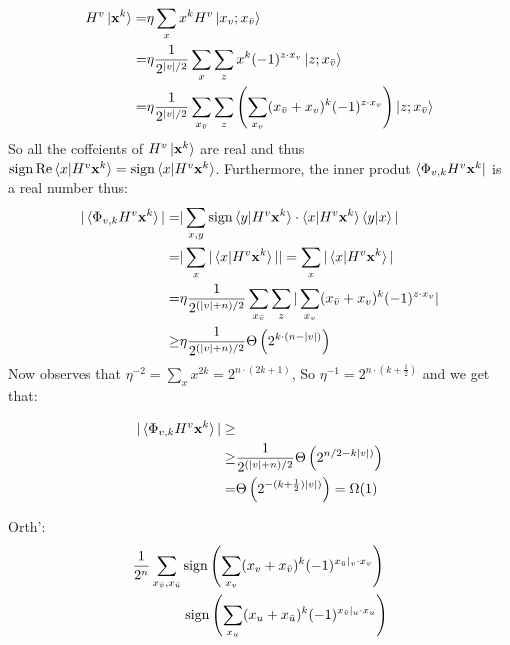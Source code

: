 \documentclass[manuscript,screen,review]{acmart}
\begin{document}
\begin{equation*}
  \begin{split}
    H^{v}\ket{\mathbf{x}^{k}} = &  \eta \sum_{x}x^{k}H^{v}\ket{x_{v};
    x_{\bar{v}}} \\
    = &  \eta \frac{1}{2^{|v|/2}}\sum_{x}\sum_{z}x^{k}(-1)^{z \cdot
    x_{v}}\ket{z ; x_{\bar{v}}}\\
    = &  \eta \frac{1}{2^{|v|/2}}\sum_{x_{\bar{v}}}\sum_{z} \left( \sum_{x_{v}}
    (x_{\bar{v}}+ x_{v})^{k}(-1)^{z \cdot x_{v}} \right) \ket{z ; x_{\bar{v}}}
  \end{split}
\end{equation*}
So all the coffcients of $H^{v}\ket{\mathbf{x}^{k}}$ are real and thus $\operatorname{sign}
\operatorname{Re} \braket{x|H^{v}\mathbf{x}^{k}} = \operatorname{sign} \braket{x|H^{v}\mathbf{x}^{k}} $.
Furthermore, the inner produt $ \bra{\Phi_{v,k} H^{v}\mathbf{x}^{k}}$ is a
real number thus:
\begin{equation*}
  \begin{split}
    |\braket{\Phi_{v,k} H^{v}\mathbf{x}^{k}}| = & | \sum_{x,y} \operatorname{sign}
    \braket{y|H^{v}\mathbf{x}^{k}} \cdot \braket{x|H^{v}\mathbf{x}^{k}}
    \braket{y|x} | \\
    = & | \sum_{x} { | \braket{x|H^{v}\mathbf{x}^{k}} |} | =  \sum_{x} { |
    \braket{x|H^{v}\mathbf{x}^{k}} |} \\
    = &  \eta \frac{1}{2^{(|v| +
    n)/2}}\sum_{x_{\bar{v}}}{\sum_{z}|\sum_{x_{v}}(x_{\bar{v}}+
      x_{v})^{k}(-1)^{z
    \cdot x_{v}}|} \\
    \ge &  \eta \frac{1}{2^{(|v| + n)/2}}\Theta\left( 2^{k\cdot(n-|v|)} \right)
  \end{split}
\end{equation*}
Now observes that $\eta^{-2} = \sum_{x}x^{2k} = 2^{n\cdot(2k+1)}$, So
$\eta^{-1} = 2^{n\cdot(k+\frac{1}{2})}$ and we get that:

\begin{equation*}
  \begin{split}
    |\braket{\Phi_{v,k} H^{v}\mathbf{x}^{k}}| \ge  & \\
  \ge &  \frac{1}{2^{(|v| + n)/2}}\Theta\left( 2^{n/2-k|v|)} \right) \\
= & \Theta\left( 2^{-(k+\frac{1}{2})|v|)} \right) = \Omega(1)
\end{split}
\end{equation*}

Orth':
\begin{equation*}
  \begin{split}
    \frac{1}{2^{n}}&  \sum_{x_{\bar{v}},x_{\bar{u}}} \operatorname{sign}\left(  \sum_{x_{v}}
    (x_{v}+x_{\bar{v}})^{k}(-1)^{x_{\bar{u}}|_{v}\cdot x_{v}}  \right) \\
    & \ \ \ \ \ \ \ \operatorname{sign}\left(  \sum_{x_{u}}
    (x_{u}+x_{\bar{u}})^{k}(-1)^{x_{\bar{v}}|_{u}\cdot x_{u}}  \right)
  \end{split}
\end{equation*}
\end{document}
